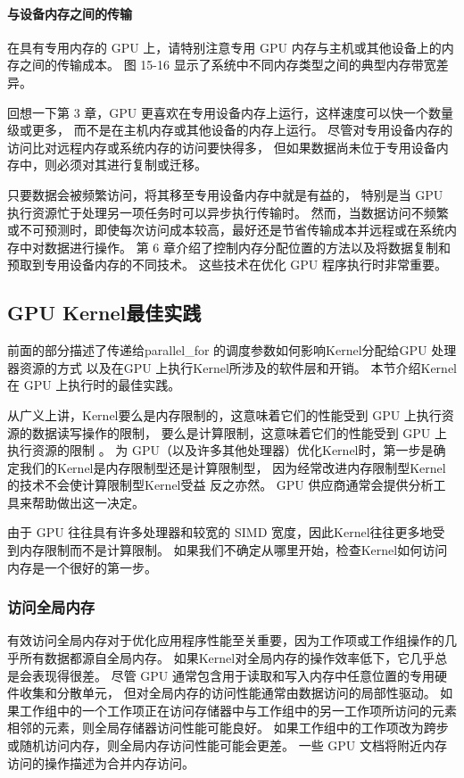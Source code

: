 \paragraph{与设备内存之间的传输}

在具有专用内存的 GPU 上，请特别注意专用 GPU 内存与主机或其他设备上的内存之间的传输成本。 
图 15-16 显示了系统中不同内存类型之间的典型内存带宽差异。

回想一下第 3 章，GPU 更喜欢在专用设备内存上运行，这样速度可以快一个数量级或更多，
而不是在主机内存或其他设备的内存上运行。 
尽管对专用设备内存的访问比对远程内存或系统内存的访问要快得多，
但如果数据尚未位于专用设备内存中，则必须对其进行复制或迁移。

只要数据会被频繁访问，将其移至专用设备内存中就是有益的，
特别是当 GPU 执行资源忙于处理另一项任务时可以异步执行传输时。 
然而，当数据访问不频繁或不可预测时，即使每次访问成本较高，最好还是节省传输成本并远程或在系统内存中对数据进行操作。 
第 6 章介绍了控制内存分配位置的方法以及将数据复制和预取到专用设备内存的不同技术。 
这些技术在优化 GPU 程序执行时非常重要。

\subsection{GPU Kernel最佳实践}
前面的部分描述了传递给parallel\_for 的调度参数如何影响Kernel分配给GPU 处理器资源的方式
以及在GPU 上执行Kernel所涉及的软件层和开销。 本节介绍Kernel在 GPU 上执行时的最佳实践。

从广义上讲，Kernel要么是内存限制的，这意味着它们的性能受到 GPU 上执行资源的数据读写操作的限制，
要么是计算限制，这意味着它们的性能受到 GPU 上执行资源的限制 。 
为 GPU（以及许多其他处理器）优化Kernel时，第一步是确定我们的Kernel是内存限制型还是计算限制型，
因为经常改进内存限制型Kernel的技术不会使计算限制型Kernel受益 反之亦然。 
GPU 供应商通常会提供分析工具来帮助做出这一决定。

由于 GPU 往往具有许多处理器和较宽的 SIMD 宽度，因此Kernel往往更多地受到内存限制而不是计算限制。 
如果我们不确定从哪里开始，检查Kernel如何访问内存是一个很好的第一步。

\subsubsection{访问全局内存}
有效访问全局内存对于优化应用程序性能至关重要，因为工作项或工作组操作的几乎所有数据都源自全局内存。 
如果Kernel对全局内存的操作效率低下，它几乎总是会表现得很差。 
尽管 GPU 通常包含用于读取和写入内存中任意位置的专用硬件收集和分散单元，
但对全局内存的访问性能通常由数据访问的局部性驱动。 
如果工作组中的一个工作项正在访问存储器中与工作组中的另一工作项所访问的元素相邻的元素，则全局存储器访问性能可能良好。 
如果工作组中的工作项改为跨步或随机访问内存，则全局内存访问性能可能会更差。 
一些 GPU 文档将附近内存访问的操作描述为合并内存访问。

